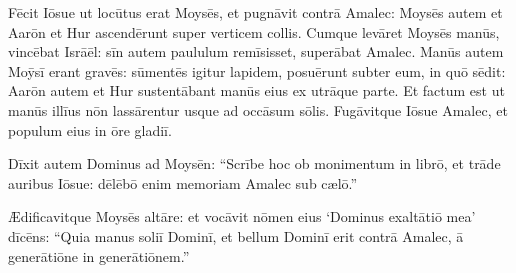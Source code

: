 Fēcit Iōsue ut locūtus erat Moysēs, et pugnāvit contrā Amalec:
Moysēs autem et Aarōn et Hur ascendērunt super verticem
collis. 
Cumque levāret Moysēs manūs, vincēbat Isrāēl: sīn autem
paululum remīsisset, superābat Amalec. 
Manūs autem Moȳsī
erant gravēs: sūmentēs igitur lapidem, posuērunt
subter eum, in quō sēdit: Aarōn autem et Hur
sustentābant manūs eius ex utrāque parte. Et factum est ut
manūs illīus nōn lassārentur usque ad occāsum sōlis. 
Fugāvitque Iōsue Amalec, et populum eius in ōre gladiī. 

Dīxit autem
Dominus ad Moysēn: ``Scrībe hoc ob monimentum in librō, et trāde auribus Iōsue: dēlēbō enim memoriam
Amalec sub cælō.'' 

Ædificavitque Moysēs altāre: et vocāvit nōmen eius
`Dominus exaltātiō mea' dīcēns: 
``Quia manus soliī Dominī,
et bellum Dominī erit contrā Amalec, ā generātiōne in generātiōnem.''
